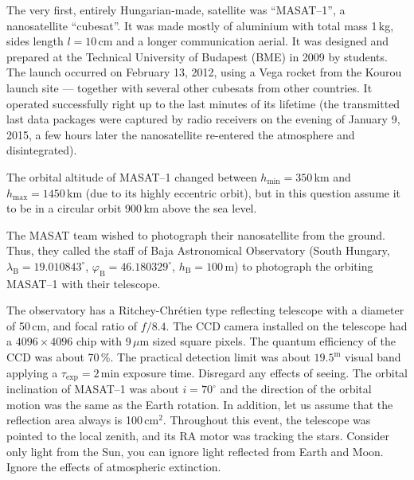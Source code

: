 
The very first, entirely Hungarian-made, satellite was ``MASAT--1'', a
nanosatellite ``cubesat''. It was made mostly of aluminium with total mass
1\,kg, sides length $l = 10$\,cm and a longer communication aerial. It was
designed and prepared at the Technical University of Budapest (BME) in 2009 by
students. The launch occurred on February 13, 2012, using a Vega rocket from
the Kourou launch site --- together with several other cubesats from other
countries. It operated successfully right up to the last minutes of its
lifetime (the transmitted last data packages were captured by radio receivers
on the evening of January 9, 2015, a few hours later the nanosatellite
re-entered the atmosphere and disintegrated).


The orbital altitude of MASAT--1 changed between $h_{\mathrm{min}} = 350$\,km
and $h_{\mathrm{max}} = 1450$\,km (due to its highly eccentric orbit), but in
this question assume it to be in a circular orbit 900\,km above the sea level.

The MASAT team wished to photograph their nanosatellite from the ground. Thus,
they called the staff of Baja Astronomical Observatory (South Hungary,
$\lambda_{\mathrm{B}} = 19.010843^\circ$,
$\varphi_{\mathrm{B}} = 46.180329^\circ$, $h_{\mathrm{B}} = 100$\,m) to
photograph the orbiting MASAT--1 with their telescope.

The observatory has a Ritchey-Chr\'etien type reflecting telescope with a
diameter of 50\,cm, and focal ratio of $f/8.4$. The CCD camera installed on the
telescope had a $4096 \times 4096$ chip with 9\,$\mu$m sized square pixels. The
quantum efficiency of the CCD was about 70\,\%. The practical detection limit
was about $19.5^{\mathrm{m}}$ visual band applying a
$\tau_{\mathrm{exp}} = 2$\,min exposure time. Disregard any effects of seeing.
The orbital inclination of MASAT--1 was about $i = 70^\circ$ and the direction
of the orbital motion was the same as the Earth rotation. In addition, let us
assume that the reflection area always is 100\,cm$^2$. Throughout this event,
the telescope was pointed to the local zenith, and its RA motor was tracking
the stars. Consider only light from the Sun, you can ignore light reflected
from Earth and Moon. Ignore the effects of atmospheric extinction.

